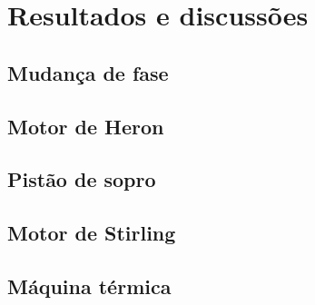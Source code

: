 \section{Resultados e discussões}

\subsection{Mudança de fase} %

\subsection{Motor de Heron} %

\subsection{Pistão de sopro} %

\subsection{Motor de Stirling} %

\subsection{Máquina térmica} %


